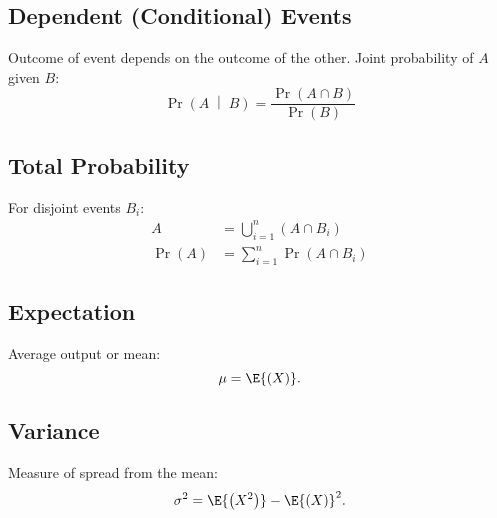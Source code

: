 \documentclass{article}
\begin{document}
\begin{multicols}{3}
    \subsection*{Dependent (Conditional) Events}
    Outcome of event depends on the outcome of the other. Joint probability of \(A\) given \(B\):
    \begin{equation*}
        \Pr{\left(A \;\middle|\; B\right)} = \frac{\Pr{\left( A \cap B \right)}}{\Pr{\left( B \right)}}
    \end{equation*}
    \subsection*{Total Probability}
    For disjoint events \(B_i\):
    \begin{align*}
        A                     & = \bigcup\limits_{i=1}^n \left( A \cap B_i \right) \\
        \Pr{\left( A \right)} & = \sum_{i=1}^n \Pr{\left( A \cap B_i \right)}
    \end{align*}
    \subsection*{Expectation}
    Average output or mean:
    \begin{equation*}
        \mu = \E{\left( X \right)}.
    \end{equation*}
    \subsection*{Variance}
    Measure of spread from the mean:
    \begin{equation*}
        \sigma^2 = \E{\left( X^2 \right)} - \E{\left( X \right)}^2.
    \end{equation*}
\end{multicols}
\end{document}
